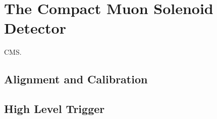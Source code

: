 \chapter{The Compact Muon Solenoid Detector}
CMS.
\section{Alignment and Calibration}
\section {High Level Trigger}
